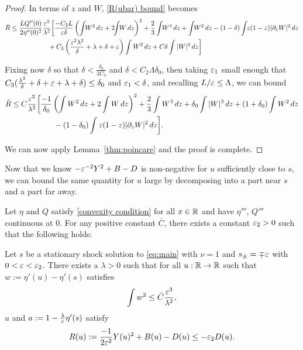 \begin{proof}
In terms of $z$ and $W$, \eqref{R(ubar) bound} becomes
\begin{align*} 
\bar{R} &\leq \frac{L Q''(0)}{2 \eta''(0)^2} \frac{\eps^2}{\lambda^2}\bigg[\frac{-C_2 L}{\eps \delta}\paren{\int\!\! W^2 \,dz + 2 \!\!\int\!\! W \,dz}^2 + \frac{2}{3}\int\!\! W^3 \,dz + \int\!\! W^2 \,dz - (1-\delta)  \int\!\! z(1-z) |\del_z W|^2 \,dz
\\ & \hspace{2cm} + C_3 \paren{\frac{\eps^2 \lambda^2}{\delta} + \lambda + \delta + \eps} \int W^2 \,dz + C \delta \int |W|^3 \,dz \bigg]
\end{align*}

Fixing now $\delta$ so that $\delta < \frac{\delta_0}{3 C_3}$ and $\delta < C_2 \Lambda \delta_0$, then taking $\varepsilon_1$ small enough that $C_3(\frac{\lambda^2}{\delta} + \delta + \varepsilon + \lambda + \delta) \leq \delta_0$ and $\varepsilon_1 < \delta$, and recalling $L/\varepsilon \leq \Lambda$, we can bound
\begin{align*} 
\bar{R} &\leq C \frac{\varepsilon^2}{\lambda^2} \bigg[ \frac{-1}{\delta_0} \left( \int W^2 \,dz + 2 \int W \,dz \right)^2 + \frac{2}{3}\int W^3 \,dz + \delta_0 \int |W|^3 \,dz + (1+\delta_0)\int W^2 \,dz 
\\ & \hspace{2cm} - (1-\delta_0) \int z(1-z) |\partial_z W|^2 \,dz \bigg]. 
\end{align*}

We can now apply Lemma~\ref{thm:poincare} and the proof is complete.  
\end{proof}

Now that we know $-\varepsilon^{-2} Y^2 + B - D$ is non-negative for $u$ sufficiently close to $s$, we can bound the same quantity for $u$ large by decomposing into a part near $s$ and a part far away.  

\begin{proposition} \label{thm:functional far}
Let $\eta$ and $Q$ satisfy \eqref{convexity condition} for all $x \in \mathbb{R}$ and have $\eta'''$, $Q'''$ continuous at 0.  For any positive constant $\bar{C}$, there exists a constant $\varepsilon_2 > 0$ such that the following holds:

Let $s$ be a stationary shock solution to \eqref{eq:main} with $\nu = 1$ and $s_{\pm}= \mp \varepsilon$ with $0 < \varepsilon < \varepsilon_2$.  There exists a $\lambda > 0$ such that for all $u:\mathbb{R} \to \mathbb{R}$ such that $w:= \eta'(u)-\eta'(s)$ satisfies
\[ \int w^2 \leq \bar{C} \frac{\varepsilon^3}{\lambda^2}, \]
$u$ and $a := 1-\frac{\lambda}{\varepsilon} \eta'(s)$ satisfy
\[ R(u) := \frac{-1}{2\varepsilon^2} Y(u)^2 + B(u) - D(u) \leq -\varepsilon_2 D(u). \]
\end{proposition}

